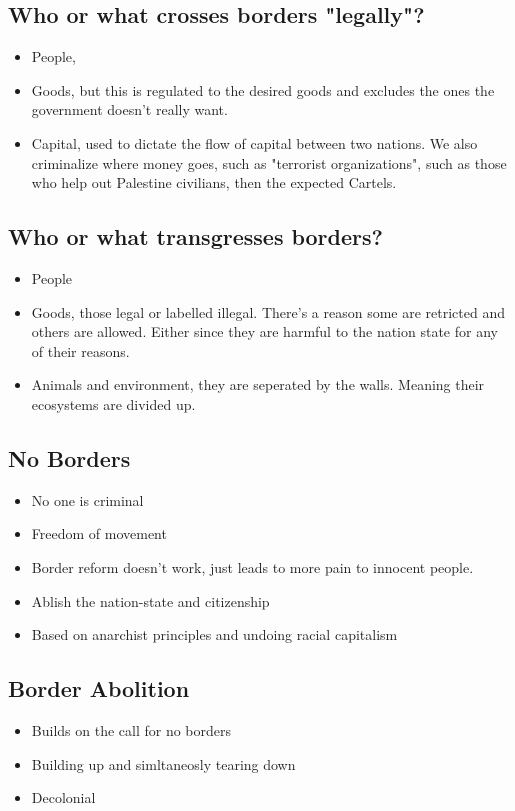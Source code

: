 \documentclass{article}
\begin{document}
\subsection{Who or what crosses borders "legally"?}
\begin{itemize}
  \item People,
  \item Goods, but this is regulated to the desired goods and
    excludes the ones the government doesn't really want.
  \item Capital, used to dictate the flow of capital between two
    nations. We also criminalize where money goes, such as
    "terrorist organizations", such as those who help out
    Palestine civilians, then the expected Cartels.
\end{itemize}

\subsection{Who or what transgresses borders?}
\begin{itemize}
  \item People
  \item Goods, those legal or labelled illegal. There's a reason
    some are retricted and others are allowed.
    Either since they are harmful to the nation state for any
    of their reasons.
  \item Animals and environment, they are seperated by the walls.  
    Meaning their ecosystems are divided up.
\end{itemize}

\subsection{No Borders}
\begin{itemize}
  \item No one is criminal
  \item Freedom of movement
  \item Border reform doesn't work, just leads to more
    pain to innocent people.
  \item Ablish the nation-state and citizenship
  \item Based on anarchist principles and undoing racial capitalism
\end{itemize}

\subsection{Border Abolition}
\begin{itemize}
  \item Builds on the call for no borders
  \item Building up and simltaneosly tearing down
  \item Decolonial
\end{itemize}
\end{document}
